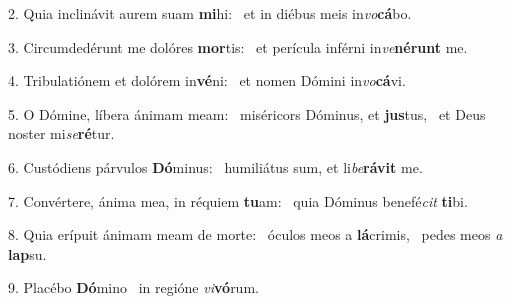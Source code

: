 2. Quia inclinávit aurem suam \textbf{mi}hi: \ast\  et in diébus meis in\textit{vo}\textbf{cá}bo.\

3. Circumdedérunt me dolóres \textbf{mor}tis: \ast\  et perícula inférni in\textit{ve}\textbf{né}\textbf{runt} me.\

4. Tribulatiónem et dolórem in\textbf{vé}ni: \ast\  et nomen Dómini in\textit{vo}\textbf{cá}vi.\

5. O Dómine, líbera ánimam meam: \dag\  miséricors Dóminus, et \textbf{jus}tus, \ast\  et Deus noster mi\textit{se}\textbf{ré}tur.\

6. Custódiens párvulos \textbf{Dó}minus: \ast\  humiliátus sum, et li\textit{be}\textbf{rá}\textbf{vit} me.\

7. Convértere, ánima mea, in réquiem \textbf{tu}am: \ast\  quia Dóminus benefé\textit{cit} \textbf{ti}bi.\

8. Quia erípuit ánimam meam de morte: \dag\  óculos meos a \textbf{lá}crimis, \ast\  pedes meos \textit{a} \textbf{lap}su.\

9. Placébo \textbf{Dó}mino \ast\  in regióne \textit{vi}\textbf{vó}rum.\

